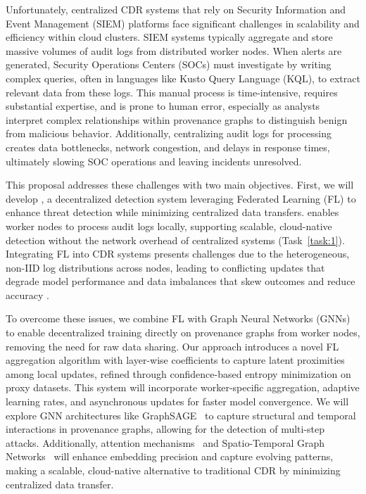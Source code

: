 Unfortunately, centralized CDR systems that rely on Security Information and Event Management (SIEM) platforms face significant challenges in scalability and efficiency within cloud clusters. SIEM systems typically aggregate and store massive volumes of audit logs from distributed worker nodes. When alerts are generated, Security Operations Centers (SOCs) must investigate by writing complex queries, often in languages like Kusto Query Language (KQL), to extract relevant data from these logs. This manual process is time-intensive, requires substantial expertise, and is prone to human error, especially as analysts interpret complex relationships within provenance graphs to distinguish benign from malicious behavior. Additionally, centralizing audit logs for processing creates data bottlenecks, network congestion, and delays in response times, ultimately slowing SOC operations and leaving incidents unresolved.

This proposal addresses these challenges with two main objectives. First, we will develop \Sysa, a decentralized detection system leveraging Federated Learning (FL) to enhance threat detection while minimizing centralized data transfers. \Sysa enables worker nodes to process audit logs locally, supporting scalable, cloud-native detection without the network overhead of centralized systems (Task~\ref{task:1}). Integrating FL into CDR systems presents challenges due to the heterogeneous, non-IID log distributions across nodes, leading to conflicting updates that degrade model performance \cite{bonawitz2019towards} and data imbalances that skew outcomes and reduce accuracy \cite{guo2023new,zhao2018federated}.

To overcome these issues, we combine FL with Graph Neural Networks (GNNs) to enable decentralized training directly on provenance graphs from worker nodes, removing the need for raw data sharing. Our approach introduces a novel FL aggregation algorithm with layer-wise coefficients to capture latent proximities among local updates, refined through confidence-based entropy minimization on proxy datasets. This system will incorporate worker-specific aggregation, adaptive learning rates, and asynchronous updates for faster model convergence. We will explore GNN architectures like GraphSAGE~\cite{lo2022graphsage} to capture structural and temporal interactions in provenance graphs, allowing for the detection of multi-step attacks. Additionally, attention mechanisms~\cite{vaswani2017attention} and Spatio-Temporal Graph Networks~\cite{yu2017spatio} will enhance embedding precision and capture evolving patterns, making \Sysa a scalable, cloud-native alternative to traditional CDR by minimizing centralized data transfer.


